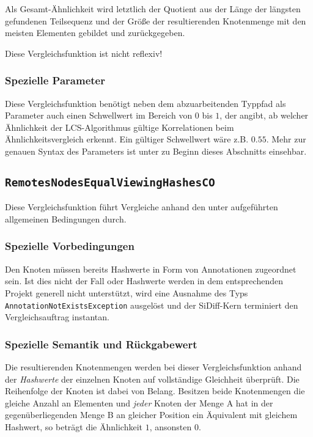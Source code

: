 Als Gesamt-Ähnlichkeit wird letztlich der Quotient aus der Länge der längsten gefundenen Teilsequenz und der Größe der resultierenden Knotenmenge mit den meisten Elementen gebildet und zurückgegeben.

 Diese Vergleichsfunktion ist nicht reflexiv!

\subsubsection*{Spezielle Parameter}
Diese Vergleichsfunktion benötigt neben dem abzuarbeitenden Typpfad als Parameter auch einen Schwellwert im Bereich von $0$ bis $1$, der angibt, ab welcher Ähnlichkeit der LCS-Algorithmus gültige Korrelationen beim Ähnlichkeitsvergleich erkennt. Ein gültiger Schwellwert wäre z.B. $0.55$. Mehr zur genauen Syntax des Parameters ist unter  zu Beginn dieses Abschnitts einsehbar.


%
%
\subsection{\texttt{RemotesNodesEqualViewingHashesCO}}
Diese Vergleichsfunktion führt Vergleiche anhand den unter  aufgeführten allgemeinen Bedingungen durch.

\subsubsection*{Spezielle Vorbedingungen}
Den Knoten müssen bereits Hashwerte in Form von Annotationen zugeordnet sein. Ist dies nicht der Fall oder Hashwerte werden in dem entsprechenden Projekt generell nicht unterstützt, wird eine Ausnahme des Typs \texttt{AnnotationNotExistsException} ausgelöst und der SiDiff-Kern terminiert den Vergleichsauftrag instantan.

\subsubsection*{Spezielle Semantik und Rückgabewert}
Die resultierenden Knotenmengen werden bei dieser Vergleichsfunktion anhand der \emph{Hashwerte} der einzelnen Knoten auf vollständige Gleichheit überprüft. Die Reihenfolge der Knoten ist dabei von Belang. Besitzen beide Knotenmengen die gleiche Anzahl an Elementen und \emph{jeder} Knoten der Menge A hat in der gegenüberliegenden Menge B an gleicher Position ein Äquivalent mit gleichem Hashwert, so beträgt die Ähnlichkeit $1$, ansonsten $0$.


